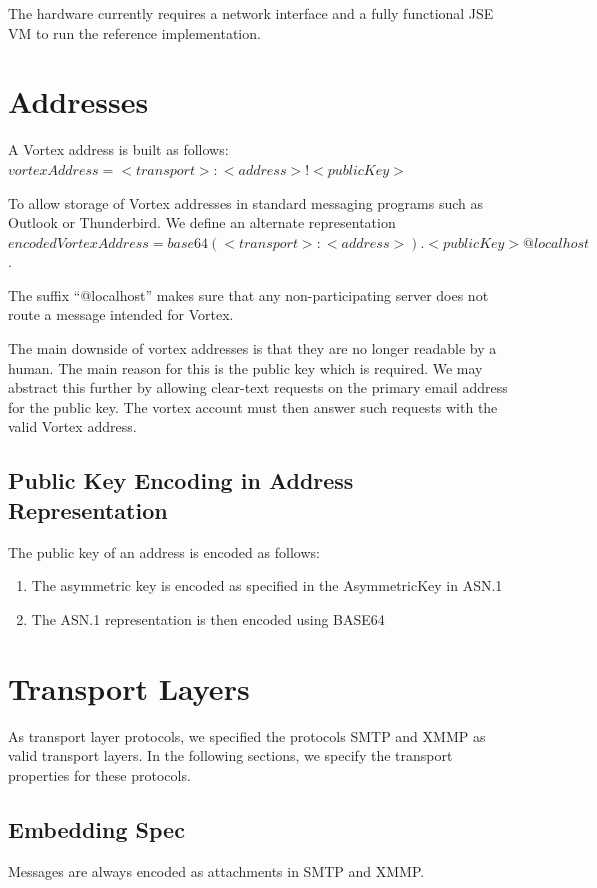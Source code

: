 The hardware currently requires a network interface and a fully functional JSE VM to run the reference implementation.

\section{Addresses}


A Vortex address is built as follows: $vortexAddress=<transport>:<address>!<publicKey>$

To allow storage of Vortex addresses in standard messaging programs such as Outlook or Thunderbird. We define an alternate representation $encodedVortexAddress=base64(<transport>:<address>).<publicKey>@localhost$. 

The suffix ``@localhost'' makes sure that any non-participating server does not route a message intended for Vortex.

The main downside of vortex addresses is that they are no longer readable by a human. The main reason for this is the public key which is required. We may abstract this further by allowing clear-text requests on the primary email address for the public key. The vortex account must then answer such requests with the valid Vortex address.

\subsection{Public Key Encoding in Address Representation}
The public key of an address is encoded as follows:
\begin{enumerate}
	\item The asymmetric key is encoded as specified in the AsymmetricKey in ASN.1
	\item The ASN.1 representation is then encoded using BASE64
\end{enumerate}    

\section{Transport Layers}                                          
As transport layer protocols, we specified the protocols SMTP and XMMP as valid transport layers. In the following sections, we specify the transport properties for these protocols.

\subsection{Embedding Spec}
Messages are always encoded as attachments in SMTP and XMMP. 

